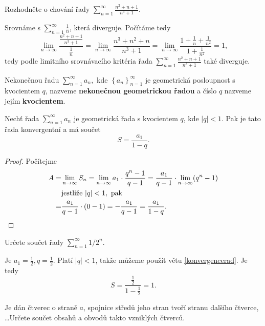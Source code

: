\begin{priklad}
Rozhodněte o chování řady $\sum_{n=1}^\infty \frac{n^2+n+1}{n^3+1}$.
\end{priklad}

\begin{reseni}
Srovnáme s $\sum_{n=1}^\infty \frac{1}{n}$, která diverguje. Počítáme tedy
$$
\lim_{n\to\infty}\frac{\frac{n^2+n+1}{n^3+1}}{\frac{1}{n}} = \lim_{n \to \infty}{ \frac{n^3 +n^2+n }{n^3+1}} = \lim_{n\to \infty}{\frac{1+\frac{1}{n}+\frac{1}{n^2}}{1+\frac{1}{n^2}}} = 1,
$$
tedy podle limitního srovnávacího kritéria řada $\sum_{n=1}^\infty \frac{n^2+n+1}{n^3+1}$ také diverguje.
\end{reseni}

\begin{definition}
Nekonečnou řadu $\sum_{n=1}^\infty a_n,$ kde $\left \{ a_n \right \}_{n=1}^\infty $
je geometrická posloupnost s kvocientem $q$, nazveme \textbf{nekonečnou geometrickou
řadou} a číslo $q$ nazveme jejím \textbf{kvocientem}.
\end{definition}

\begin{veta}\label{konvergencerad}
    Nechť řada $\sum_{n=1}^\infty a_n$ je geometrická řada s kvocientem $q$, kde
    $|q|<1.$ Pak je tato řada konvergentní a má součet
    $$S=\frac{a_1}{1-q}.$$
\end{veta}

\begin{proof}
Počítejme
\begin{align*}
    A =&\lim_{n\to\infty} S_n = \lim_{n\to\infty}a_1\cdot \frac{q^n - 1}{q-1}=\frac{a_1}{q-1}\cdot \lim_{n\to\infty}(q^n-1)\\
    & \textrm{jestliže } |q|<1, \textrm{ pak} \\
    = & \frac{a_1}{q-1}\cdot (0-1)=-\frac{a_1}{q-1}=\frac{a_1}{1-q}.\qedhere
\end{align*}
\end{proof}


\begin{priklad}
Určete součet řady $\sum_{n=1}^\infty 1/2^n.$
\end{priklad}

\begin{reseni}
Je $a_1=\frac{1}{2},q=\frac{1}{2}$. Platí $|q|<1$, takže můžeme použít větu
\ref{konvergencerad}. Je tedy
$$
    S = \frac{\frac{1}{2}}{1-\frac{1}{2}} = 1.
$$
\end{reseni}

\begin{priklad}
Je dán čtverec o straně $a$, spojnice středů jeho stran tvoří stranu dalšího čtverce,
\dots Určete součet obsahů a obvodů takto vzniklých čtverců.
\end{priklad}

